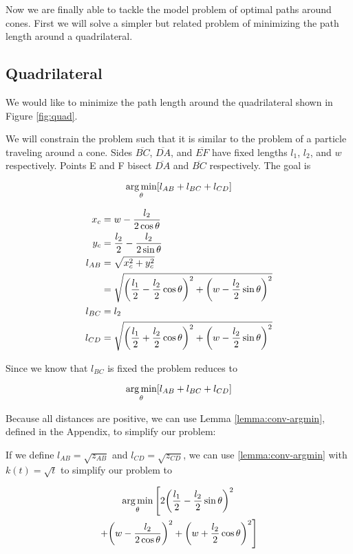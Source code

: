 Now we are finally able to tackle the model problem of optimal paths around cones. First we will solve a simpler but related problem of minimizing the path length around a quadrilateral.

\subsection{Quadrilateral}

We would like to minimize the path length around the quadrilateral shown in Figure \ref{fig:quad}.


We will constrain the problem such that it is similar to the problem of a particle traveling around a cone. Sides $\overline{BC}$, $\overline{DA}$, and $\overline{EF}$ have fixed lengths $l_1$, $l_2$, and $w$ respectively. Points E and F bisect $\overline{DA}$ and $\overline{BC}$ respectively. The goal is

\[
\argmin_{\theta} \bracket{l_{AB} + l_{BC} + l_{CD}}
\]

\begin{align}
  x_c& = w - \frac{l_2}{2 \cos{\theta}}\\
  y_c& = \frac{l_2}{2} - \frac{l_2}{2 \sin{\theta}}\\
  l_{AB}& = \sqrt{x_c^2 + y_c^2}\\
  & = \sqrt{ \paren{\frac{l_1}{2} - \frac{l_2}{2} \cos\theta}^2 + \paren{w - \frac{l_2}{2} \sin\theta}^2 }\\
  l_{BC}& = l_2\\
  l_{CD}& = \sqrt{\paren{\frac{l_1}{2} + \frac{l_2}{2} \cos\theta}^2 + \paren{w - \frac{l_2}{2} \sin\theta}^2 }
\end{align}

Since we know that $l_{BC}$ is fixed the problem reduces to

\[
\argmin_{\theta} \bracket{l_{AB} + l_{BC} + l_{CD}}
\]

Because all distances are positive, we can use Lemma \ref{lemma:conv-argmin}, defined in the Appendix, to simplify our problem:

If we define $l_{AB} = \sqrt{z_{AB}}$ and $l_{CD} = \sqrt{z_{CD}}$, we can use \ref{lemma:conv-argmin} with $k(t) = \sqrt{t}$ to simplify our problem to

\begin{multline}
  \argmin_{\theta} \left[ 2\paren{\frac{l_1}{2} - \frac{l_2}{2} \sin\theta}^2 \right.\\
  \left. + \paren{w - \frac{l_2}{2 \cos\theta}}^2 + \paren{w + \frac{l_2}{2} \cos\theta}^2 \right]
\end{multline}

